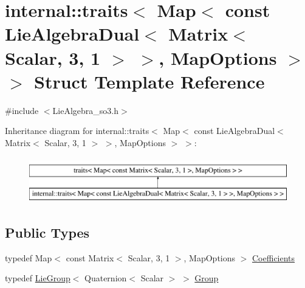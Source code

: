\hypertarget{structinternal_1_1traits_3_01_map_3_01const_01_lie_algebra_dual_3_01_matrix_3_01_scalar_00_013_0e77a233aa7e2f28dddf71e39df1dd866}{}\section{internal\+:\+:traits$<$ Map$<$ const Lie\+Algebra\+Dual$<$ Matrix$<$ Scalar, 3, 1 $>$ $>$, Map\+Options $>$ $>$ Struct Template Reference}
\label{structinternal_1_1traits_3_01_map_3_01const_01_lie_algebra_dual_3_01_matrix_3_01_scalar_00_013_0e77a233aa7e2f28dddf71e39df1dd866}


{\ttfamily \#include $<$Lie\+Algebra\+\_\+so3.\+h$>$}

Inheritance diagram for internal\+:\+:traits$<$ Map$<$ const Lie\+Algebra\+Dual$<$ Matrix$<$ Scalar, 3, 1 $>$ $>$, Map\+Options $>$ $>$\+:\begin{figure}[H]
\begin{center}
\leavevmode
\includegraphics[height=2.000000cm]{structinternal_1_1traits_3_01_map_3_01const_01_lie_algebra_dual_3_01_matrix_3_01_scalar_00_013_0e77a233aa7e2f28dddf71e39df1dd866}
\end{center}
\end{figure}
\subsection*{Public Types}
\begin{DoxyCompactItemize}
\item 
typedef Map$<$ const Matrix$<$ Scalar, 3, 1 $>$, Map\+Options $>$ \hyperlink{structinternal_1_1traits_3_01_map_3_01const_01_lie_algebra_dual_3_01_matrix_3_01_scalar_00_013_0e77a233aa7e2f28dddf71e39df1dd866_a925f17123c9a6154ed57fa5c397780cd}{Coefficients}
\item 
typedef \hyperlink{class_lie_group}{Lie\+Group}$<$ Quaternion$<$ Scalar $>$ $>$ \hyperlink{structinternal_1_1traits_3_01_map_3_01const_01_lie_algebra_dual_3_01_matrix_3_01_scalar_00_013_0e77a233aa7e2f28dddf71e39df1dd866_af93405032a1b0062e9c3ca662f0cfcbe}{Group}
\end{DoxyCompactItemize}



